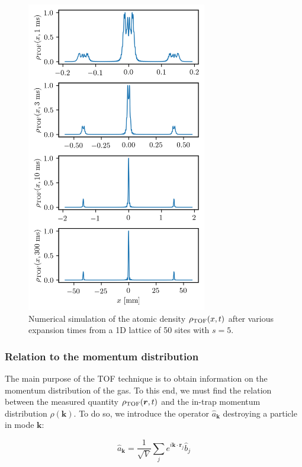 \begin{figure}
    \centering
    \includegraphics[width=0.7\textwidth]{Fig/Chapter2/TOF_expansion.png}
    \caption{Numerical simulation of the atomic density $\rho_{\rm{TOF}}(x,t)$ after various expansion times from a 1D lattice of 50 sites with $s=5$.}
    \label{fig:my_label}
\end{figure}

\subsubsection{Relation to the momentum distribution}

The main purpose of the TOF technique is to obtain information on the momentum distribution of the gas. To this end, we must find the relation between the measured quantity $\rho_{\rm{TOF}}(\bm{r},t)$ and the in-trap momentum distribution $\rho(\bm{k})$. To do so, we introduce the operator $\hat{a}_{\bm{k}}$ destroying a particle in mode $\bm{k}$:

\begin{equation}
    \hat{a}_{\bm{k}}=\frac{1}{\sqrt{V}} \sum_{j} e^{i \bm{k} \cdot \bm{r}_{j}} \hat{b}_{j}
\end{equation}


